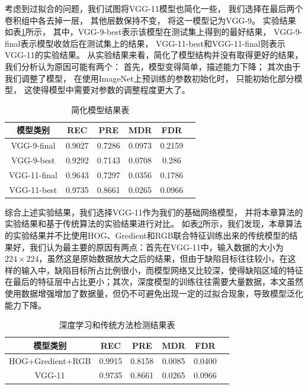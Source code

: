 考虑到过拟合的问题，我们试图将VGG-11模型也简化一些，
我们选择在最后两个卷积组中各去掉一层，
其他层数保持不变，
将这一模型记为VGG-9。
实验结果如表\ref{tab:jianhuajiegou}所示，
其中，VGG-9-best表示该模型在测试集上得到的最好结果，
VGG-9-final表示模型收敛后在测试集上的结果，
VGG-11-best和VGG-11-final则表示VGG-11的实验结果。
从实验结果来看，简化了模型结构并没有取得更好的结果，我们分析认为原因可能有两个：
首先，模型变得简单，描述能力下降；
其次由于我们调整了模型，
在使用ImageNet上预训练的参数初始化时，
只能初始化部分模型，
这使得模型中需要对参数的调整程度更大了。
\begin{table}[htbp]
\centering
\begin{tabular}{cccccp{38mm}}
\toprule
\textbf{模型类别} & \textbf{REC} & \textbf{PRE} & \textbf{MDR} & \textbf{FDR}\\
\midrule
\mbox{VGG-9-final} & 0.9027 & 0.7286 & 0.0973 & 0.2159\\
\mbox{VGG-9-best} & 0.9292 & 0.7143 & 0.0708 & 0.286\\
\mbox{VGG-11-final} & 0.9643 & 0.7297 & 0.0356 & 0.1786\\
\mbox{VGG-11-best} & 0.9735 & 0.8661 & 0.0265 & 0.0966\\
\bottomrule
\end{tabular}
\caption{简化模型结果表}
\label{tab:jianhuajiegou}
\end{table}
综合上述实验结果，我们选择VGG-11作为我们的基础网络模型，
并将本章算法的实验结果和基于传统算法的实验结果进行对比。
如表\ref{tab:shenduxuexijieguo}所示，我们发现，本章算法的实验结果并不比使用HOG、Gredient和RGB联合特征训练出来的传统模型的结果好，我们认为最主要的原因有两点：首先在VGG-11中，输入数据的大小为$224\times 224$，虽然这是原始数据放大之后的结果，但由于缺陷目标往往较小，在这样的输入中，缺陷目标所占比例很小，而模型网络又比较深，使得缺陷区域的特征在最后的特征层中占比更小；其次，深度模型的训练往往需要大量数据，本文虽然使用数据增强增加了数据量，但仍不可避免出现一定的过拟合现象，导致模型泛化能力下降。
\begin{table}[htbp]
\centering
\begin{tabular}{cccccp{38mm}}
\toprule
\textbf{模型类别} & \textbf{REC} & \textbf{PRE} & \textbf{MDR} & \textbf{FDR}\\
\midrule
\mbox{HOG+Gredient+RGB} & 0.9915 & 0.8158 & 0.0085 & 0.0400\\
\mbox{VGG-11} & 0.9735 & 0.8661 & 0.0265 & 0.0966\\
\bottomrule
\end{tabular}
\caption{深度学习和传统方法检测结果表}
\label{tab:shenduxuexijieguo}
\end{table}
